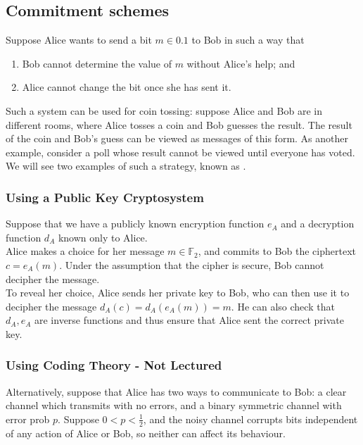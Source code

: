 \subsection{Commitment schemes}
Suppose Alice wants to send a bit $m \in \qty{0,1}$ to Bob in such a way that
\begin{enumerate}
    \item Bob cannot determine the value of $m$ without Alice's help; and
    \item Alice cannot change the bit once she has sent it.
\end{enumerate}
Such a system can be used for coin tossing: suppose Alice and Bob are in different rooms, where Alice tosses a coin and Bob guesses the result.
The result of the coin and Bob's guess can be viewed as messages of this form.
As another example, consider a poll whose result cannot be viewed until everyone has voted.
We will see two examples of such a  strategy, known as .

\subsubsection{Using a Public Key Cryptosystem}
Suppose that we have a publicly known encryption function $e_A$ and a decryption function $d_A$ known only to Alice. \\
Alice makes a choice for her message $m \in \mathbb{F}_2$, and commits to Bob the ciphertext $c = e_A(m)$.
Under the assumption that the cipher is secure, Bob cannot decipher the message. \\
To reveal her choice, Alice sends her private key to Bob, who can then use it to decipher the message $d_A(c) = d_A(e_A(m)) = m$.
He can also check that $d_A, e_A$ are inverse functions and thus ensure that Alice sent the correct private key.

\subsubsection{Using Coding Theory - Not Lectured}
Alternatively, suppose that Alice has two ways to communicate to Bob: a clear channel which transmits with no errors, and a binary symmetric channel with error prob $p$.
Suppose $0 < p < \frac{1}{2}$, and the noisy channel corrupts bits independent of any action of Alice or Bob, so neither can affect its behaviour.

